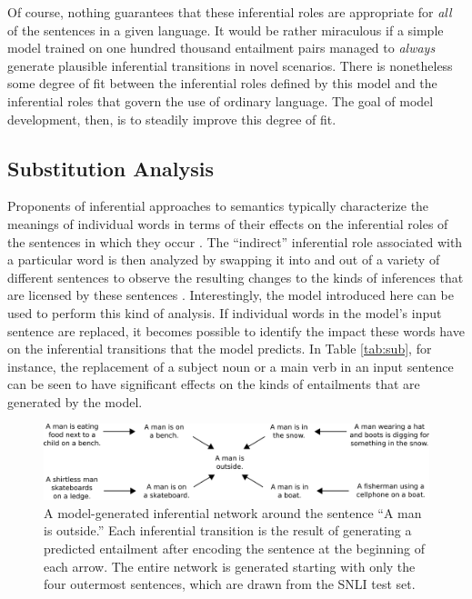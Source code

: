 \documentclass[utf8]{frontiersSCNS} %
\begin{document}
Of course, nothing guarantees that these inferential roles are appropriate for \textit{all} of the sentences in a given language. It would be rather miraculous if a simple model trained on one hundred thousand entailment pairs managed to \textit{always} generate plausible inferential transitions in novel scenarios. There is nonetheless some degree of fit between the inferential roles defined by this model and the inferential roles that govern the use of ordinary language. The goal of model development, then, is to steadily improve this degree of fit.

\subsection{Substitution Analysis}\label{sec:substitution}

Proponents of inferential approaches to semantics typically characterize the meanings of individual words in terms of their effects on the inferential roles of the sentences in which they occur \citep{Brandom:1994,Brandom:2000,Block:1986}. The ``indirect'' inferential role associated with a particular word is then analyzed by swapping it into and out of a variety of different sentences to observe the resulting changes to the kinds of inferences that are licensed by these sentences \citep{Brandom:1994}. Interestingly, the model introduced here can be used to perform this kind of analysis. If individual words in the model's input sentence are replaced, it becomes possible to identify the impact these words have on the inferential transitions that the model predicts. In Table \ref{tab:sub}, for instance, the replacement of a subject noun or a main verb in an input sentence can be seen to have significant effects on the kinds of entailments that are generated by the model. 

\begin{figure}[t]
\begin{center}
\includegraphics[width=6in]{figures/chain.png}
\end{center}
\caption{A model-generated inferential network around the sentence ``A man is outside.'' Each inferential transition is the result of generating a predicted entailment after encoding the sentence at the beginning of each arrow. The entire network is generated starting with only the four outermost sentences, which are drawn from the SNLI test set.} 
\label{chain}
\end{figure}
\end{document}
